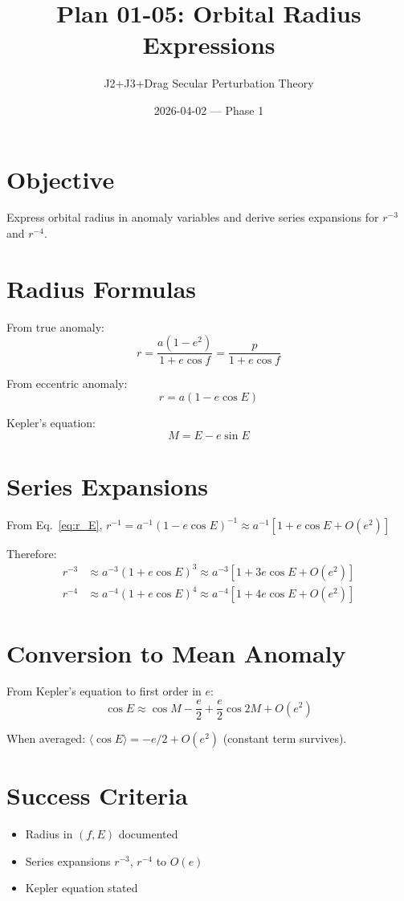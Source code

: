 \documentclass[11pt]{article}
\title{Plan 01-05: Orbital Radius Expressions}
\author{J2+J3+Drag Secular Perturbation Theory}
\date{2026-04-02 — Phase 1}
\begin{document}
\maketitle

\section{Objective}
Express orbital radius in anomaly variables and derive series expansions for $r^{-3}$ and $r^{-4}$.

\section{Radius Formulas}

From true anomaly:
\begin{equation}
r = \frac{a(1-e^2)}{1 + e\cos f} = \frac{p}{1 + e\cos f}
\end{equation}

From eccentric anomaly:
\begin{equation}
\boxed{r = a(1 - e\cos E)}
\label{eq:r_E}
\end{equation}

Kepler's equation:
\begin{equation}
M = E - e\sin E
\end{equation}

\section{Series Expansions}

From Eq.~\eqref{eq:r_E}, $r^{-1} = a^{-1}(1 - e\cos E)^{-1} \approx a^{-1}[1 + e\cos E + O(e^2)]$

Therefore:
\begin{align}
r^{-3} &\approx a^{-3}(1 + e\cos E)^3 \approx a^{-3}[1 + 3e\cos E + O(e^2)]\\
r^{-4} &\approx a^{-4}(1 + e\cos E)^4 \approx a^{-4}[1 + 4e\cos E + O(e^2)]
\end{align}

\section{Conversion to Mean Anomaly}

From Kepler's equation to first order in $e$:
\begin{equation}
\cos E \approx \cos M - \frac{e}{2} + \frac{e}{2}\cos 2M + O(e^2)
\end{equation}

When averaged: $\langle \cos E \rangle = -e/2 + O(e^2)$ (constant term survives).

\section{Success Criteria}
\begin{itemize}
    \item[$\checkmark$] Radius in $(f, E)$ documented
    \item[$\checkmark$] Series expansions $r^{-3}$, $r^{-4}$ to $O(e)$
    \item[$\checkmark$] Kepler equation stated
\end{itemize}
\end{document}
